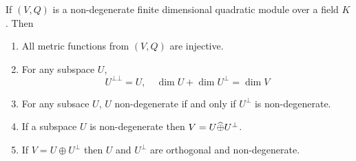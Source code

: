 \begin{prop}
    If $(V,Q)$ is a non-degenerate finite dimensional 
    quadratic module over a field $K$.
    Then 
    \begin{enumerate}
        \item All metric functions from $(V,Q)$
            are injective.
        \item For any subspace $U$, 
            \[U^{\bot\bot} = U ,
            \quad \dim U + \dim U^\bot  = \dim V\]
        \item For any subsace $U$, 
            $U$ non-degenerate if and only if $U^\bot$ 
            is non-degenerate.
        \item If a subspace $U$ is non-degenerate then
            $V = U \widehat{\oplus} U^\bot$.
        \item If $V = U \oplus U^\bot$ then 
            $U$ and $U^\bot$ are orthogonal 
            and non-degenerate.
    \end{enumerate}
\end{prop}
